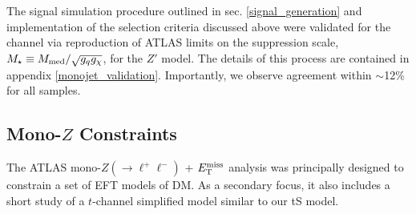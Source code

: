 The signal simulation procedure outlined in sec. \ref{signal_generation} and implementation of the selection criteria discussed above were validated for the \monojet channel via reproduction of ATLAS limits on the suppression scale, $M_{\star} \equiv M_{\mathrm{med}} / \sqrt{g_q g_{\chi}}$, for the $Z'$ model. The details of this process are contained in appendix \ref{monojet_validation}. Importantly, we observe agreement within $\sim$12\% for all samples.



\subsection{Mono-$Z$ Constraints}
\label{monoZ_constraints}
The ATLAS mono-$Z(\rightarrow \ell^+ \ell^-)$ + $E_{\mathrm{T}}^{\mathrm{miss}}$ analysis \cite{Aad:2014monoZlep} was principally designed to constrain a set of EFT models of DM. As a secondary focus, it also includes a short study of a $t$-channel simplified model similar to our tS model.


